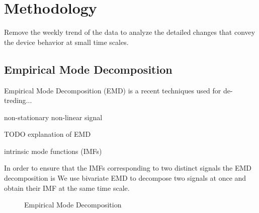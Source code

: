 \section{Methodology}\label{method}
Remove the weekly trend of the data to analyze the detailed changes that convey the device behavior at small time scales.

\subsection{Empirical Mode Decomposition}

Empirical Mode Decomposition (EMD) \cite{huang:emd1998} is a recent techniques used for de-treding...

non-stationary non-linear signal

TODO explanation of EMD


intrinsic mode functions (IMFs)

In order to ensure that the IMFs corresponding to two distinct signals the EMD decomposition is 
We use bivariate EMD \cite{rilling:biemd2007} to decompose two signals at once and obtain their IMF at the same time scale.

\begin{figure}
 \caption{Empirical Mode Decomposition}
\end{figure}
